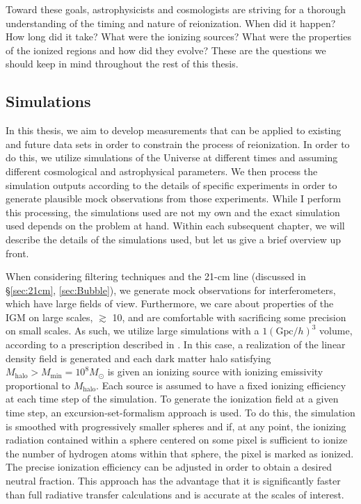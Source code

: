 Toward these goals, astrophysicists and cosmologists are striving for a thorough understanding of the timing and nature of reionization. When did it happen? How long did it take? What were the ionizing sources? What were the properties of the ionized regions and how did they evolve? These are the questions we should keep in mind throughout the rest of this thesis.

\subsection{Simulations}

In this thesis, we aim to develop measurements that can be applied to existing and future data sets in order to constrain the process of reionization.  In order to do this, we utilize simulations of the Universe at different times and assuming different cosmological and astrophysical parameters. We then process the simulation outputs according to the details of specific experiments in order to generate plausible mock observations from those experiments. While I perform this processing, the simulations used are not my own and the exact simulation used depends on the problem at hand. Within each subsequent chapter, we will describe the details of the simulations used, but let us give a brief overview up front.


When considering filtering techniques and the 21-cm line (discussed in \S \ref{sec:21cm}, \ref{sec:Bubble}), we generate mock observations for interferometers, which have large fields of view. Furthermore, we care about properties of the IGM on large scales, $\gtrsim$ 10\mpch, and are comfortable with sacrificing some precision on small scales. As such, we utilize large simulations with a $1 (\text{Gpc}/h)^{3}$ volume, according to a prescription described in \cite{Zahn2006}. In this case, a realization of the linear density field is generated and each dark matter halo satisfying $M_{\text{halo}} > M_{\text{min}} = 10^{8}M_{\odot}$ is given an ionizing source with ionizing emissivity proportional to $M_{\text{halo}}$. Each source is assumed to have a fixed ionizing efficiency at each time step of the simulation.  To generate the ionization field at a given time step, an excursion-set-formalism approach is used. To do this, the simulation is smoothed with progressively smaller spheres and if, at any point, the ionizing radiation contained within a sphere centered on some pixel is sufficient to ionize the number of hydrogen atoms within that sphere, the pixel is marked as ionized. The precise ionization efficiency can be adjusted in order to obtain a desired neutral fraction. This approach has the advantage that it is significantly faster than full radiative transfer calculations and is accurate at the scales of interest. 


